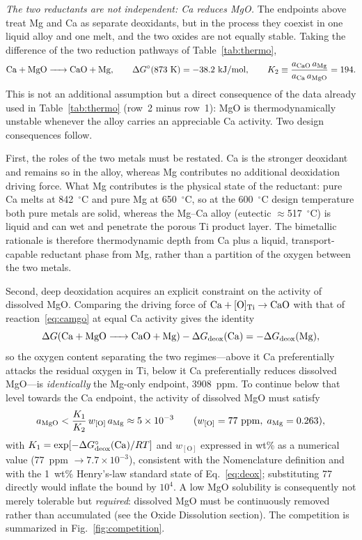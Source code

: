 \documentclass[11pt]{article}
\begin{document}
\emph{The two reductants are not independent: Ca reduces MgO.} The endpoints above treat Mg and Ca as separate deoxidants, but in the process they coexist in one liquid alloy and one melt, and the two oxides are not equally stable. Taking the difference of the two reduction pathways of Table~\ref{tab:thermo},
\begin{equation}
\label{eq:camgo}
\ce{Ca + MgO -> CaO + Mg}, \qquad \Delta G^{\circ}(873~\mathrm{K}) = -38.2~\mathrm{kJ/mol}, \qquad K_2 \equiv \frac{a_{\ce{CaO}}\,a_{\mathrm{Mg}}}{a_{\mathrm{Ca}}\,a_{\ce{MgO}}} = 194 .
\end{equation}
This is not an additional assumption but a direct consequence of the data already used in Table~\ref{tab:thermo} (row~2 minus row~1): MgO is thermodynamically unstable whenever the alloy carries an appreciable Ca activity. Two design consequences follow.

First, the roles of the two metals must be restated. Ca is the stronger deoxidant and remains so in the alloy, whereas Mg contributes no additional deoxidation driving force. What Mg contributes is the physical state of the reductant: pure Ca melts at 842~$^{\circ}$C and pure Mg at 650~$^{\circ}$C, so at the 600~$^{\circ}$C design temperature both pure metals are solid, whereas the Mg--Ca alloy (eutectic $\approx$517~$^{\circ}$C) is liquid and can wet and penetrate the porous Ti product layer. The bimetallic rationale is therefore thermodynamic depth from Ca plus a liquid, transport-capable reductant phase from Mg, rather than a partition of the oxygen between the two metals.

Second, deep deoxidation acquires an explicit constraint on the activity of dissolved MgO. Comparing the driving force of $\ce{Ca} + [\mathrm{O}]_{\mathrm{Ti}} \to \ce{CaO}$ with that of reaction~\ref{eq:camgo} at equal Ca activity gives the identity
\begin{equation}
\label{eq:cross}
\Delta G(\ce{Ca + MgO -> CaO + Mg}) - \Delta G_{\mathrm{deox}}(\ce{Ca}) = -\Delta G_{\mathrm{deox}}(\ce{Mg}),
\end{equation}
so the oxygen content separating the two regimes---above it Ca preferentially attacks the residual oxygen in Ti, below it Ca preferentially reduces dissolved MgO---is \emph{identically} the Mg-only endpoint, 3908~ppm. To continue below that level towards the Ca endpoint, the activity of dissolved MgO must satisfy
\begin{equation}
\label{eq:amgo}
a_{\ce{MgO}} < \frac{K_1}{K_2}\,w_{[\mathrm{O}]}\,a_{\mathrm{Mg}} \approx 5\times10^{-3} \qquad (w_{[\mathrm{O}]} = 77~\mathrm{ppm},\; a_{\mathrm{Mg}} = 0.263),
\end{equation}
with $K_1 = \exp[-\Delta G^{\circ}_{\mathrm{deox}}(\ce{Ca})/RT]$ and $w_{[\mathrm{O}]}$ expressed in wt\% as a numerical value (77~ppm $\rightarrow 7.7\times10^{-3}$), consistent with the Nomenclature definition and with the 1~wt\% Henry's-law standard state of Eq.~\ref{eq:deox}; substituting 77 directly would inflate the bound by $10^{4}$. A low MgO solubility is consequently not merely tolerable but \emph{required}: dissolved MgO must be continuously removed rather than accumulated (see the Oxide Dissolution section). The competition is summarized in Fig.~\ref{fig:competition}.
\end{document}
